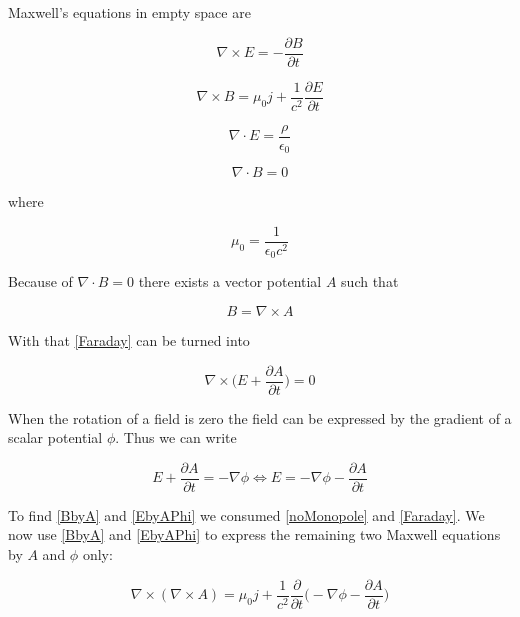 \documentclass{article}
\begin{document}
Maxwell's equations in empty space are 


\begin{equation} \label{Faraday}
\nabla \times E = - \frac{\partial B}{\partial t}
\end{equation}

\begin{equation}
\nabla \times B = \mu_0 j +  \frac{1}{c^2} \frac{\partial E}{\partial t}
\end{equation}

\begin{equation}
\nabla \cdot E = \frac{\rho}{\epsilon_0}
\end{equation}

\begin{equation} \label{noMonopole}
\nabla \cdot B = 0
\end{equation}

where

\begin{equation}
\mu_0 = \frac{1}{\epsilon_0 c^2}
\end{equation}

Because of $\nabla \cdot B = 0$ there exists a vector potential $A$ such that

\begin{equation} \label{BbyA}
\boxed{B = \nabla \times A}
\end{equation}

With that \ref{Faraday} can be turned into

\begin{equation}
\nabla \times \bigg( E + \frac{\partial A}{\partial t} \bigg) = 0
\end{equation}

When the rotation of a field is zero the field can be expressed by the gradient of a scalar potential $\phi$. Thus we can write

\begin{equation} \label{EbyAPhi}
E + \frac{\partial A}{\partial t} = - \nabla \phi
\iff
\boxed{E = - \nabla \phi - \frac{\partial A}{\partial t}}
\end{equation}

To find \ref{BbyA} and \ref{EbyAPhi} we consumed \ref{noMonopole} and \ref{Faraday}. We now use \ref{BbyA} and \ref{EbyAPhi} to express the remaining two Maxwell equations by $A$ and $\phi$ only:

\begin{equation} \label{MaxwellAPhi1}
\nabla \times ( \nabla \times A) = \mu_0 j + \frac{1}{c^2} \frac{\partial}{\partial t} \bigg(- \nabla \phi - \frac{\partial A}{\partial t} \bigg)
\end{equation}
\end{document}
